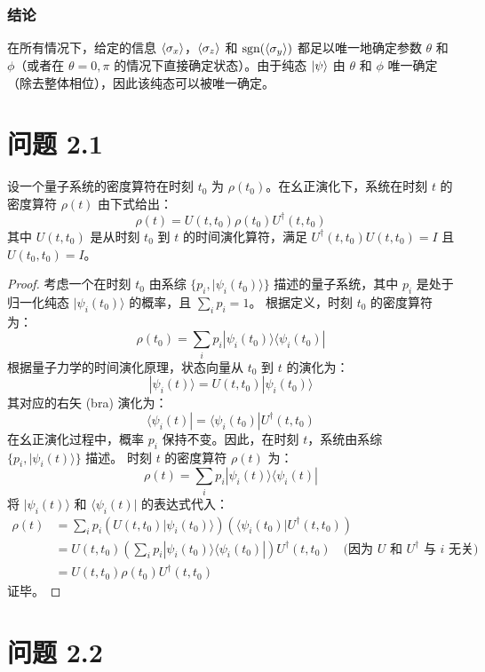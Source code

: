 \documentclass[12pt, a4paper]{article}
\begin{document}
\subsubsection*{结论}
在所有情况下，给定的信息 \(\expval{\sigma_x}\)，\(\expval{\sigma_z}\) 和 \(\text{sgn}(\expval{\sigma_y})\) 都足以唯一地确定参数 \(\theta\) 和 \(\phi\)（或者在 \(\theta=0, \pi\) 的情况下直接确定状态）。由于纯态 \(\ket{\psi}\) 由 \(\theta\) 和 \(\phi\) 唯一确定（除去整体相位），因此该纯态可以被唯一确定。
\section*{问题 2.1}

设一个量子系统的密度算符在时刻 \(t_0\) 为 \(\rho(t_0)\)。在幺正演化下，系统在时刻 \(t\) 的密度算符 \(\rho(t)\) 由下式给出：
\[
\rho(t) = U(t, t_0) \rho(t_0) U^\dagger(t, t_0)
\]
其中 \(U(t, t_0)\) 是从时刻 \(t_0\) 到 \(t\) 的时间演化算符，满足 \(U^\dagger(t, t_0) U(t, t_0) = I\) 且 \(U(t_0, t_0) = I\)。

\begin{proof}
考虑一个在时刻 \(t_0\) 由系综 \(\{ p_i, |\psi_i(t_0)\rangle \}\) 描述的量子系统，其中 \(p_i\) 是处于归一化纯态 \(|\psi_i(t_0)\rangle\) 的概率，且 \(\sum_i p_i = 1\)。
根据定义，时刻 \(t_0\) 的密度算符为：
\[
\rho(t_0) = \sum_i p_i |\psi_i(t_0)\rangle \langle \psi_i(t_0)|
\]
根据量子力学的时间演化原理，状态向量从 \(t_0\) 到 \(t\) 的演化为：
\[
|\psi_i(t)\rangle = U(t, t_0) |\psi_i(t_0)\rangle
\]
其对应的右矢 (bra) 演化为：
\[
\langle \psi_i(t)| = \langle \psi_i(t_0)| U^\dagger(t, t_0)
\]
在幺正演化过程中，概率 \(p_i\) 保持不变。因此，在时刻 \(t\)，系统由系综 \(\{ p_i, |\psi_i(t)\rangle \}\) 描述。
时刻 \(t\) 的密度算符 \(\rho(t)\) 为：
\[
\rho(t) = \sum_i p_i |\psi_i(t)\rangle \langle \psi_i(t)|
\]
将 \(|\psi_i(t)\rangle\) 和 \(\langle \psi_i(t)|\) 的表达式代入：
\begin{align*}
\rho(t) &= \sum_i p_i \left( U(t, t_0) |\psi_i(t_0)\rangle \right) \left( \langle \psi_i(t_0)| U^\dagger(t, t_0) \right) \\
&= U(t, t_0) \left( \sum_i p_i |\psi_i(t_0)\rangle \langle \psi_i(t_0)| \right) U^\dagger(t, t_0) \quad \text{(因为 \(U\) 和 \(U^\dagger\) 与 \(i\) 无关)} \\
&= U(t, t_0) \rho(t_0) U^\dagger(t, t_0)
\end{align*}
证毕。
\end{proof}

\section*{问题 2.2}
\end{document}
